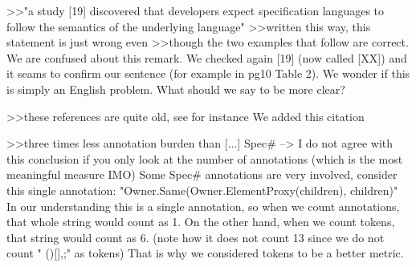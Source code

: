 >>"a study [19] discovered that developers expect specification languages to follow the semantics of the underlying language"
>>written this way, this statement is just wrong even
>>though the two examples that follow are correct.
We are confused about this remark. We checked again [19] (now called [XX]) and it seams to confirm our sentence (for example in pg10 Table 2).
We wonder if this is simply an English problem. What should we say to be more clear?

>>these references are quite old, see for instance
We added this citation

>>three times less annotation burden than [...] Spec# --> I do not agree with this conclusion if you only look at the number of annotations (which is the most meaningful measure IMO)
Some Spec# annotations are very involved, consider this single annotation:
"Owner.Same(Owner.ElementProxy(children), children)" In our understanding this is a single annotation, so when we count annotations, that whole string would count as 1.
On the other hand, when we count tokens, that string would count as 6.
(note how it does not count 13 since we do not count " ()[]{},;" as tokens)
That is why we considered tokens to be a better metric.

